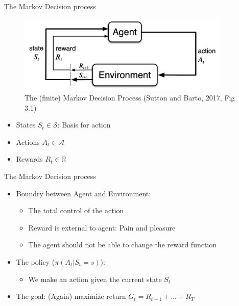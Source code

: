 \documentclass[10pt]{beamer}
\begin{document}
\begin{frame}{The Markov Decision process}

\begin{figure}[h]
\centering
\includegraphics[width=0.9\textwidth]{fig/sutton_fig_3_1.png}
\caption{The (finite) Markov Decision Process (Sutton and Barto, 2017, Fig 3.1)}
\end{figure}

\begin{itemize}
\item States $S_t \in \mathcal{S}$: Basis for action
\item Actions $A_t \in \mathcal{A}$
\item Rewards $R_t \in \mathbb{R}$
\end{itemize}

\end{frame}


\begin{frame}{The Markov Decision process}

\begin{itemize}
\item Boundry between Agent and Environment:
\begin{itemize}
\item The {\color{uured}total control} of the action\pause
\item Reward is {\color{uured}external} to agent: Pain and pleasure
\item The agent should {\color{uured}not be able to change the reward function}
\end{itemize}
\pause
\item The policy ($\pi(A_t|S_t=s)$):
\begin{itemize}
\item We make an action given the current state $S_t$
\end{itemize}
\item {\color{uured}The goal}: (Again) maximize return $G_t = R_{t+1} + ... + R_{T}$
\end{itemize}

\end{frame}
\end{document}
